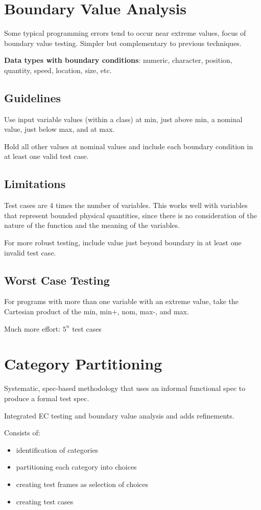 \documentclass[11pt]{article}
\begin{document}
\section{Boundary Value Analysis}
\label{sec:org6bfa044}
Some typical programming errors tend to occur near extreme values,
focus of boundary value testing.
Simpler but complementary to previous techniques.

\textbf{Data types with boundary conditions}: numeric, character, position,
quantity, speed, location, size, etc.
\subsection{Guidelines}
\label{sec:org9229884}
Use input variable values (within a class) at min, just above min,
a nominal value, just below max, and at max.

Hold all other values at nominal values and include each boundary condition
in at least one valid test case.
\subsection{Limitations}
\label{sec:org7821089}
Test cases are 4 times the number of variables.
This works well with variables that represent bounded physical quantities, since
there is no consideration of the nature of the function and the meaning
of the variables.

For more robust testing, include value just beyond boundary in at least
one invalid test case.
\subsection{Worst Case Testing}
\label{sec:orgd1fdb0c}
For programs with more than one variable with an extreme value,
take the Cartesian product of the min, min+, nom, max-, and max.

Much more effort: \(5^{n}\) test cases
\section{Category Partitioning}
\label{sec:org035e0fd}
Systematic, spec-based methodology that uses an informal functional spec to
produce a formal test spec.

Integrated EC testing and boundary value analysis and adds refinements.

Consists of:
\begin{itemize}
\item identification of categories
\item partitioning each category into choices
\item creating test frames as selection of choices
\item creating test cases
\end{itemize}
\end{document}
